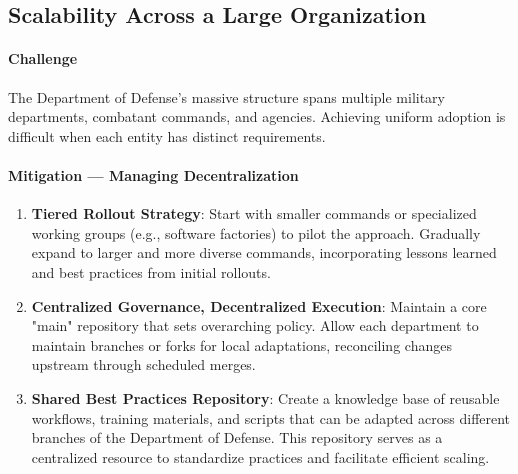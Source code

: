 \documentclass[11pt]{article}
\begin{document}
	\subsection{Scalability Across a Large Organization}
	\paragraph{Challenge}
	The Department of Defense's massive structure spans multiple military departments, combatant commands, and agencies. Achieving uniform adoption is difficult when each entity has distinct requirements.

	\paragraph{Mitigation --- Managing Decentralization}
	\begin{enumerate}
		\item \textbf{Tiered Rollout Strategy}: Start with smaller commands or specialized working groups (e.g., software factories) to pilot the approach. Gradually expand to larger and more diverse commands, incorporating lessons learned and best practices from initial rollouts.
		\item \textbf{Centralized Governance, Decentralized Execution}: Maintain a core "main" repository that sets overarching policy. Allow each department to maintain branches or forks for local adaptations, reconciling changes upstream through scheduled merges.
		\item \textbf{Shared Best Practices Repository}: Create a knowledge base of reusable workflows, training materials, and scripts that can be adapted across different branches of the Department of Defense. This repository serves as a centralized resource to standardize practices and facilitate efficient scaling.
	\end{enumerate}
\end{document}
